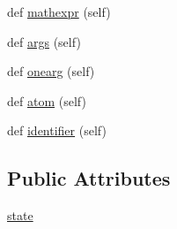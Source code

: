 \begin{DoxyCompactItemize}
def \hyperlink{class_prolog_rules_parser_1_1_prolog_rules_parser_ac21c5fb3ea30e45c0fefae658a50ad37}{mathexpr} (self)
\item 
def \hyperlink{class_prolog_rules_parser_1_1_prolog_rules_parser_af5d305599be41a95ef7ab92e94967118}{args} (self)
\item 
def \hyperlink{class_prolog_rules_parser_1_1_prolog_rules_parser_a52feaec449cb21dfdb7398e0d610070e}{onearg} (self)
\item 
def \hyperlink{class_prolog_rules_parser_1_1_prolog_rules_parser_a06997778b8bf5a80b797df9773f823d7}{atom} (self)
\item 
def \hyperlink{class_prolog_rules_parser_1_1_prolog_rules_parser_a30e594fbc5e975cd855565d7c6e8170b}{identifier} (self)
\end{DoxyCompactItemize}
\subsection*{Public Attributes}
\begin{DoxyCompactItemize}
\item 
\hyperlink{class_prolog_rules_parser_1_1_prolog_rules_parser_a250a340ccf9e9fcefe5b2e8b4197385f}{state}
\end{DoxyCompactItemize}
